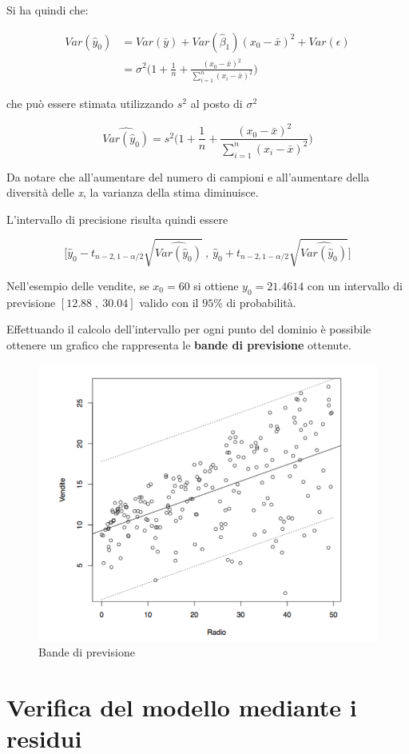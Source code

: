 Si ha quindi che:

\begin{align*}
	Var(\hat{y}_0) &= Var(\bar{y}) + Var(\hat{\beta}_1)(x_0 - \bar{x})^2 + Var(\epsilon) \\
	                         &= \sigma^2 \Bigg( 1 + \frac{1}{n} + \frac{(x_0 - \bar{x})^2}{\sum_{i=1}^{n} (x_i - \bar{x})^2 }\Bigg)
\end{align*}

che può essere stimata utilizzando $ s^2 $ al posto di $ \sigma^2 $

$$
\widehat{Var(\hat{y}_0)} = s^2 \Bigg( 1 + \frac{1}{n} + \frac{(x_0 - \bar{x})^2}{\sum_{i=1}^{n} (x_i - \bar{x})^2} \Bigg)
$$

Da notare che all'aumentare del numero di campioni e all'aumentare della diversità delle \textit{x}, la varianza della stima diminuisce.

L'intervallo di precisione risulta quindi essere

$$
\Bigg[ \hat{y}_0 - t_{n-2, 1-\alpha/2}\sqrt{\widehat{Var(\hat{y}_0)}} \:, \:\hat{y}_0 + t_{n-2, 1-\alpha/2}\sqrt{\widehat{Var(\hat{y}_0)}}\Bigg]
$$

Nell'esempio delle vendite, se $ x_0 = 60 $ si ottiene $ y_0 = 21.4614 $ con un intervallo di previsione $ [12.88 \; , \: 30.04] $ valido con il $ 95\% $ di probabilità.

Effettuando il calcolo dell'intervallo per ogni punto del dominio è possibile ottenere un grafico che rappresenta le \textbf{bande di previsione} ottenute.

\begin{figure}[htbp]
\centering
\includegraphics[width=.5\textwidth]{./notes/immagini/l6-fig10-1.png}
\caption{Bande di previsione}
\end{figure}

\section{Verifica del modello mediante i residui}

